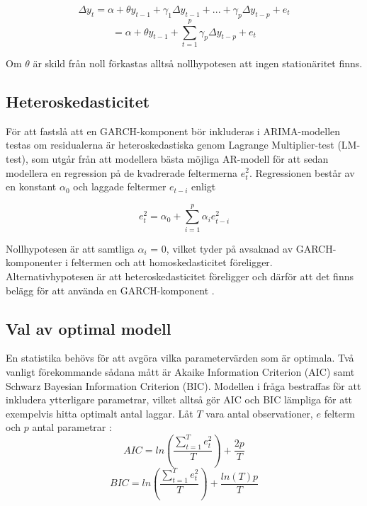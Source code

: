 \documentclass[11pt]{article}
\numberwithin{equation}{section}
\numberwithin{table}{section}
\numberwithin{figure}{section}
\begin{document}
\begin{equation}
    \Delta y_t = \alpha + \theta y_{t-1} + \gamma_1\Delta y_{t-1} + ... + \gamma_p\Delta y_{t-p} + e_t
\end{equation}
\begin{equation}
        = \alpha + \theta y_{t-1} + \sum_{t=1}^{p}\gamma_p \Delta y_{t-p} + e_t
\end{equation}

Om \(\theta\) är skild från noll förkastas alltså nollhypotesen att ingen stationäritet finns.

\subsection{Heteroskedasticitet}

För att fastslå att en GARCH-komponent bör inkluderas i ARIMA-modellen testas om residualerna är heteroskedastiska genom Lagrange Multiplier-test (LM-test), som utgår från att modellera bästa möjliga AR-modell för att sedan modellera en regression på de kvadrerade feltermerna \(e_t^2\). Regressionen består av en konstant \(\alpha_0\) och laggade feltermer \(e_{t-i}\) enligt

\begin{equation}
    e_t^2=\alpha_0+\sum_{i=1}^{p}\alpha_ie_{t-i}^2
\end{equation}

Nollhypotesen är att samtliga \(\alpha_i\) = 0, vilket tyder på avsaknad av GARCH-komponenter i feltermen och att homoskedasticitet föreligger. Alternativhypotesen är att heteroskedasticitet föreligger och därför att det finns belägg för att använda en GARCH-komponent \parencite{engle1982autoregressive}. 

\subsection{Val av optimal modell}
En statistika behövs för att avgöra vilka parametervärden som är optimala. Två vanligt förekommande sådana mått är Akaike Information Criterion (AIC) samt Schwarz Bayesian Information Criterion (BIC). Modellen i fråga bestraffas för att inkludera ytterligare parametrar, vilket alltså gör AIC och BIC lämpliga för att exempelvis hitta optimalt antal laggar. Låt $T$ vara antal observationer, $e$ felterm och $p$ antal parametrar \parencite[][s.76 f.]{montgomery2015forecasting}:
\begin{equation}
    AIC = ln\left( \frac{\sum_{t=1}^{T}e^2_t}{T} \right)+\frac{2p}{T}
\end{equation}
\begin{equation}
    BIC = ln\left( \frac{\sum_{t=1}^{T}e^2_t}{T} \right)+\frac{ln(T)p}{T}
\end{equation}
\end{document}
